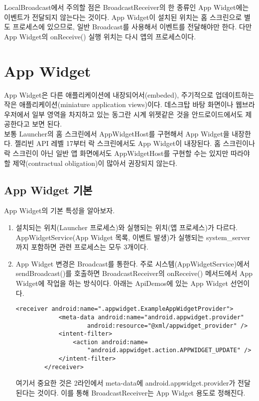 LocalBroadcast에서 주의할 점은 BroadcastReceiver의 한 종류인 App Widget에는 이벤트가 전달되지 않는다는 것이다. App Widget이 설치된 위치는 홈 스크린으로 별도 프로세스에 있으므로, 일반 Broadcast를 사용해서 이벤트를 전달해야만 한다. 다만 App Widget의 onReceive() 실행 위치는 다시 앱의 프로세스이다.

\begin{comment}
별도 스레드내에서 sendBroadcastSync를 할 수 밖에 없다고 하면 onReceive 안에다가 UI를 건드리는 쪽에는 runOnUIThread 해도 되지만 참 번거로운 일이 되네요.

Activity의 runOnUIThread는 호출하는 곳이 uiThread가 아니면 역시 post를 해주고 있어요.
runOnUIThread는 해결책이라고 볼 수가 없네요.

\end{comment}

\section{App Widget}
App Widget은 다른 애플리케이션에 내장되어서(embeded), 주기적으로 업데이트하는 작은 애플리케이션(miniature application views)이다. 데스크탑 바탕 화면이나 웹브라우저에서 일부 영역을 차지하고 있는 동그란 시계 위젯같은 것을 안드로이드에서도 제공한다고 보면 된다.\\

보통 Launcher의 홈 스크린에서 AppWidgetHost를 구현해서 App Widget을 내장한다. 젤리빈 API 레벨 17부터 락 스크린에서도 App Widget이 내장된다. 홈 스크린이나 락 스크린이 아닌 일반 앱 화면에서도 AppWidgetHost를 구현할 수는 있지만 따라야 할 제약(contractual obligation)이 많아서 권장되지 않는다.

\subsection{App Widget 기본}
App Widget의 기본 특성을 알아보자.
\begin{enumerate}
\item 설치되는 위치(Launcher 프로세스)와 실행되는 위치(앱 프로세스)가 다르다. AppWidgetService(App Widget 목록, 이벤트 발생)가 실행되는 system\_server까지 포함하면 관련 프로세스는 모두 3개이다.
\item App Widget 변경은 Broadcast를 통한다. 주로 시스템(AppWidgetService)에서 sendBroadcast()를 호출하면 BroadcastReceiver의 onReceive() 메서드에서 App Widget에 작업을 하는 방식이다.
아래는 ApiDemos에 있는 App Widget 선언이다.
\begin{lstlisting}[frame=single] 
        <receiver android:name=".appwidget.ExampleAppWidgetProvider">
            <meta-data android:name="android.appwidget.provider"
                    android:resource="@xml/appwidget_provider" />
            <intent-filter>
                <action android:name=
                	"android.appwidget.action.APPWIDGET_UPDATE" />
            </intent-filter>
        </receiver>
\end{lstlisting}
여기서 중요한 것은 2라인에서 meta-data에 android.appwidget.provider가 전달된다는 것이다. 이를 통해 BroadcastReceiver는 App Widget 용도로 정해진다.
\end{enumerate}

